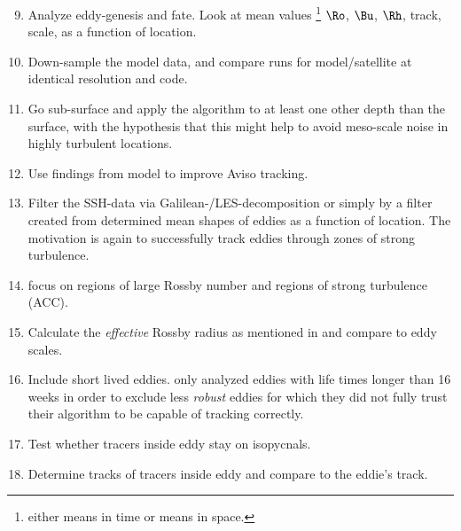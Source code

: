 \begin{enumerate}
\setcounter{enumi}{8}
\item
Analyze eddy-genesis and fate. Look at mean values \footnote{either means in time or means in space.} $\Ro$, $\Bu$, $\Rh$, track, scale, as a function of location.

\item
Down-sample the model data, and compare runs for model/satellite at identical
resolution and code.

\item
Go sub-surface and apply the algorithm to at least one other depth than the surface, with the hypothesis that this might help to avoid meso-scale noise in highly turbulent locations.

\item
Use findings from model to improve Aviso tracking.
\item
Filter the SSH-data via Galilean-/LES-decomposition \cite{Adrian2000a} or simply
by a filter created from determined mean shapes of eddies as a function of
location. The motivation is again to successfully track eddies through zones of
strong turbulence.

\item
focus on regions of large Rossby number and regions of strong turbulence (ACC).

\item
Calculate the \emph{effective} Rossby radius as mentioned in \cite{Vollmer2013a} and compare to eddy scales.

\item
Include short lived eddies. \cite{Chelton2011} only analyzed eddies with life times longer than 16 weeks in order to exclude less \textit{robust} eddies for which they did not fully trust their algorithm to be capable of tracking correctly.

\item
Test whether tracers inside eddy stay on isopycnals.

\item
Determine tracks of tracers inside eddy and compare to the eddie's track.


\end{enumerate}
